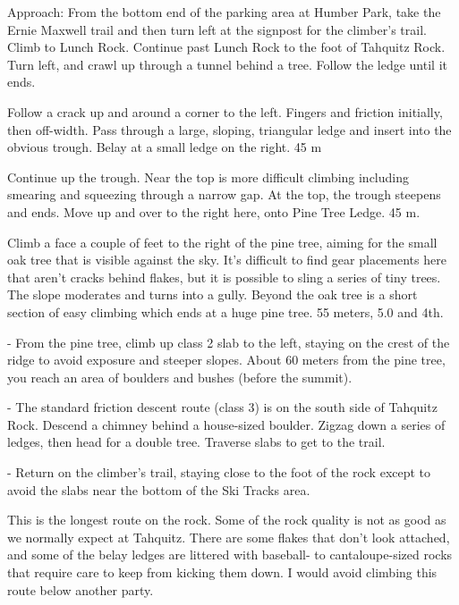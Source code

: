 \documentclass{tahquitz}
\begin{document}
Approach: From the bottom end of the parking area at Humber Park,
take the Ernie Maxwell trail and then turn left at the signpost for
the climber's trail. Climb to Lunch Rock. Continue past Lunch Rock to
the foot of Tahquitz Rock. Turn left, and crawl up through a tunnel
behind a tree. Follow the ledge until it ends.

 Follow a crack up and around a corner to the left. Fingers and
friction initially, then off-width. Pass through a large, sloping,
triangular ledge and insert into the obvious trough. Belay at a small
ledge on the right. 45 m

 Continue up the trough. Near the top is more difficult climbing
including smearing and squeezing through a narrow gap. At the top,
the trough steepens and ends. Move up and over to the right here,
onto Pine Tree Ledge. 45 m.

 Climb a face a couple of feet to the right of the pine tree,
aiming for the small oak tree that is visible against the sky. It's
difficult to find gear placements here that aren't cracks behind
flakes, but it is possible to sling a series of tiny trees. The slope
moderates and turns into a gully. Beyond the oak tree is a short
section of easy climbing which ends at a huge pine tree. 55 meters,
5.0 and 4th.

- From the pine tree, climb up class 2 slab to the left, staying on
the crest of the ridge to avoid exposure and steeper slopes. About 60
meters from the pine tree, you reach an area of boulders and bushes
(before the summit).

- The standard friction descent route (class 3) is on the south side
of Tahquitz Rock. Descend a chimney behind a house-sized boulder.
Zigzag down a series of ledges, then head for a double tree. Traverse
slabs to get to the trail.

- Return on the climber's trail, staying close to the foot of the
rock except to avoid the slabs near the bottom of the Ski Tracks area.





This is the longest route on the rock. Some of the
rock quality is not as good as we normally expect at Tahquitz. There
are some flakes that don't look attached, and some of the belay ledges
are littered with baseball- to cantaloupe-sized rocks that require care
to keep from kicking them down. I would avoid climbing this route below
another party.
\end{document}
